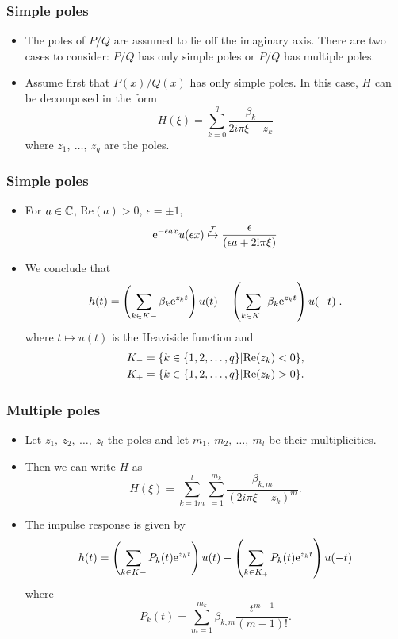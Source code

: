 \begin{frame}
\frametitle{Simple poles}
\begin{itemize}
\item The poles of $P/Q$ are assumed to lie off the imaginary axis. There are two cases to consider: $P/Q$ has only simple poles or $P/Q$ has multiple poles.
\item Assume first that $P(x)/Q(x)$ has only simple poles. In this case, $H$ can be decomposed in the form
$$
H(\xi)=\sum_{k=0}^{q}\frac{\beta_{k}}{2i\pi\xi-z_{k}}
$$
where $z_{1},\ \ldots,\ z_{q}$ are the poles.
\end{itemize}
\end{frame}

\begin{frame}
\frametitle{Simple poles}
\begin{itemize}
\item For $a \in \mathbb{C}$, $\mathrm{Re}(a) > 0$, $\epsilon= \pm 1$,
\[
\mathrm{e}^{-\epsilon a x} u(\epsilon x) \stackrel{\mathcal{F}}{\mapsto} \frac{\epsilon}{(\epsilon a + 2 \mathrm{i} \pi \xi)}
\]
\item We conclude that
$$
h(t)=\left(\sum_{k\in K-}\beta_{k} \mathrm{e}^{z_{k}t} \right)u(t)- \left(\sum_{k\in K_{+}}\beta_{k} \mathrm{e}^{z_{k}t} \right)u(-t) \;.
$$
where $t \mapsto u(t)$ is the Heaviside function and
\begin{align*}
K_{-} &=\{k\in\{1,2,\ldots,q\}|{\rm Re}(z_{k})<0\}, \\
K_{+} &=\{k\in\{1,2,\ldots,q\}|{\rm Re}(z_{k})>0\}.
\end{align*}
\end{itemize}
\end{frame}

\begin{frame}
\frametitle{Multiple poles}
\begin{itemize}
\item Let $z_{1},\ z_{2},\ \ldots,\ z_{l}$ the poles and let $m_{1},\ m_{2},\ \ldots,\ m_{l}$ be their multiplicities.
\item Then we can write $H$ as
$$
H(\xi)=\sum_{k=1m}^{l}\sum_{=1}^{m_{k}}\frac{\beta_{k,m}}{(2i\pi\xi-z_{k})^{m}}.
$$
\item The impulse response is given by
$$
h(t)=\left(\displaystyle \sum_{k\in K-}P_{k}(t) \mathrm{e}^{z_{k}t}\right)u(t)-\left(\sum_{k\in K_{+}}P_{k}(t) \mathrm{e}^{z_{k}t}\right)u(-t)
$$
where
$$
P_{k}(t)=\sum_{m=1}^{m_{k}}\beta_{k,m} \frac{t^{m-1}}{(m-1)!}.
$$
\end{itemize}
\end{frame}
  
